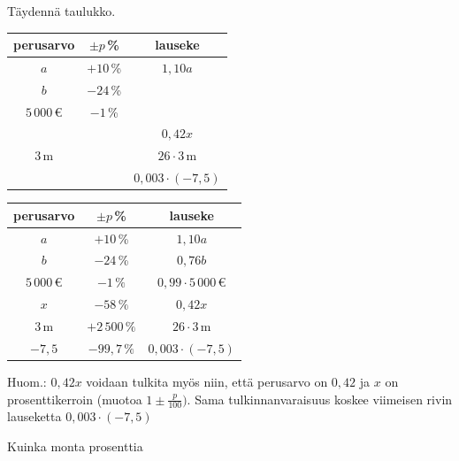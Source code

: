 \begin{tehtavasivu}
\begin{tehtava}
Täydennä taulukko. \\
\begin{tabular}{|c|c|c|}
\hline 
perusarvo & $\pm p$\,\% & lauseke \\ 
\hline 
$a$ & $+10$\,\% & $1,10a$ \\ 
\hline 
$b$ & $-24$\,\% & \\ 
\hline 
$5\,000$\,€ & $-1$\,\% & \\ 
\hline 
 & & $0,42x$ \\ 
\hline 
 $3$\,m& & $26\cdot 3$\,m \\ 
\hline
  & &$0,003\cdot(-7,5)$ \\
\hline
\end{tabular}
	\begin{vastaus}
\begin{tabular}{|c|c|c|}
\hline 
perusarvo & $\pm p$\,\% & lauseke \\ 
\hline 
$a$ & $+10$\,\% & $1,10a$ \\ 
\hline 
$b$ & $-24$\,\% &$0,76b$ \\ 
\hline 
$5\,000$\,€ & $-1\,\%$ &$0,99\cdot5\,000\,$€ \\ 
\hline 
$x$ &$-58\,\%$ & $0,42x$ \\ 
\hline 
 $3$\,m&$+2\,500\,\%$ &$26\cdot3$\,m \\ 
 \hline
 $-7,5$ & $-99,7\,\%$ & $0,003\cdot(-7,5)$ \\
  \hline %
\end{tabular}

Huom.: $0,42x$ voidaan tulkita myös niin, että perusarvo on $0,42$ ja $x$ on prosenttikerroin (muotoa $1\pm \frac{p}{100})$. Sama tulkinnanvaraisuus koskee viimeisen rivin lauseketta $0,003\cdot (-7,5)$
	\end{vastaus}
\end{tehtava}

\begin{tehtava}
    Kuinka monta prosenttia
    \begin{vastaus}
    \end{vastaus}
\end{tehtava}


\end{tehtavasivu}
